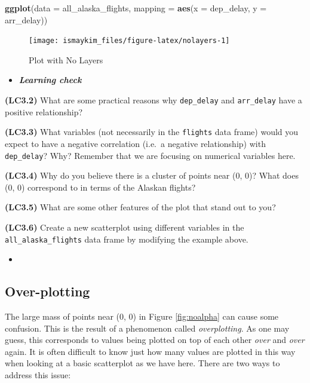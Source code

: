 \documentclass[12pt,]{krantz}
\makeatletter
\newenvironment{Shaded}{\begin{snugshade}}{\end{snugshade}}
\newcommand{\KeywordTok}[1]{\textcolor[rgb]{0.27,0.27,0.27}{\textbf{#1}}}
\newcommand{\DataTypeTok}[1]{\textcolor[rgb]{0.27,0.27,0.27}{#1}}
\newcommand{\NormalTok}[1]{#1}
\newenvironment{kframe}{%
\medskip{}
\setlength{\fboxsep}{.8em}
 \def\at@end@of@kframe{}%
 \ifinner\ifhmode%
  \def\at@end@of@kframe{\end{minipage}}%
  \begin{minipage}{\columnwidth}%
 \fi\fi%
 \def\FrameCommand##1{\hskip\@totalleftmargin \hskip-\fboxsep
 \colorbox{shadecolor}{##1}\hskip-\fboxsep
     \hskip-\linewidth \hskip-\@totalleftmargin \hskip\columnwidth}%
 \MakeFramed {\advance\hsize-\width
   \@totalleftmargin\z@ \linewidth\hsize
   \@setminipage}}%
 {\par\unskip\endMakeFramed%
 \at@end@of@kframe}
\renewenvironment{Shaded}{\begin{kframe}}{\end{kframe}}
\newenvironment{rmdblock}[1]
  {\begin{shaded*}
  \begin{itemize}
  \renewcommand{\labelitemi}{
    \raisebox{-.7\height}[0pt][0pt]{
    }
  }
  \item
  }
  {
  \end{itemize}
  \end{shaded*}
  }
\newenvironment{learncheck}
  {\begin{rmdblock}{warning}}
  {\end{rmdblock}}
\makeatother
\begin{document}
\begin{Shaded}
\begin{Highlighting}[]
\KeywordTok{ggplot}\NormalTok{(}\DataTypeTok{data =}\NormalTok{ all_alaska_flights, }
       \DataTypeTok{mapping =} \KeywordTok{aes}\NormalTok{(}\DataTypeTok{x =}\NormalTok{ dep_delay, }\DataTypeTok{y =}\NormalTok{ arr_delay))}
\end{Highlighting}
\end{Shaded}

\begin{figure}

{\centering \texttt{[image: ismaykim\_files/figure-latex/nolayers-1]} 

}

\caption{Plot with No Layers}\label{fig:nolayers}
\end{figure}

\begin{learncheck}
\textbf{\emph{Learning check}}
\end{learncheck}

\textbf{(LC3.2)} What are some practical reasons why \texttt{dep\_delay}
and \texttt{arr\_delay} have a positive relationship?

\textbf{(LC3.3)} What variables (not necessarily in the \texttt{flights}
data frame) would you expect to have a negative correlation (i.e.~a
negative relationship) with \texttt{dep\_delay}? Why? Remember that we
are focusing on numerical variables here.

\textbf{(LC3.4)} Why do you believe there is a cluster of points near
(0, 0)? What does (0, 0) correspond to in terms of the Alaskan flights?

\textbf{(LC3.5)} What are some other features of the plot that stand out
to you?

\textbf{(LC3.6)} Create a new scatterplot using different variables in
the \texttt{all\_alaska\_flights} data frame by modifying the example
above.

\begin{learncheck}

\end{learncheck}

\subsection{Over-plotting}\label{overplotting}

The large mass of points near (0, 0) in Figure \ref{fig:noalpha} can
cause some confusion. This is the result of a phenomenon called
\emph{overplotting}. As one may guess, this corresponds to values being
plotted on top of each other \emph{over} and \emph{over} again. It is
often difficult to know just how many values are plotted in this way
when looking at a basic scatterplot as we have here. There are two ways
to address this issue:
\end{document}
